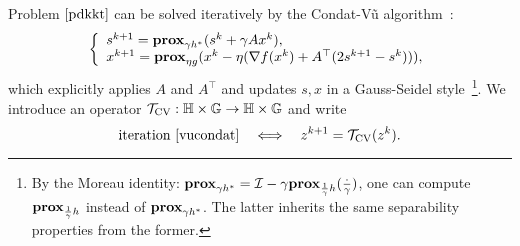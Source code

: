 {{
Problem $\eqref{pdkkt}$ can be solved iteratively by the Condat-V\~{u} algorithm~\cite{condat2013primal, vu2013splitting}:
\begin{equation}
\left\{
\begin{array}{l}
s^{k+1}=\prox_{\gamma h^*} (s^k+\gamma Ax^k),\\
x^{k+1}=\prox_{\eta g}(x^k-\eta(\nabla f(x^k)+A^\top(2s^{k+1}-s^k))),
\end{array}
\right.\label{vucondat}
\end{equation}
which explicitly applies $A$ and $A^\top$ and updates $s,x$ in a Gauss-Seidel style~\footnote{By the Moreau identity: $\mathbf{prox}_{\gamma h^*}={\mathcal{I}} -\gamma \mathbf{prox}_{\frac{1}{\gamma}h}(\frac{\cdot}{\gamma})$, one can compute $\mathbf{prox}_{\frac{1}{\gamma} h}$ instead of $\mathbf{prox}_{\gamma h^*}$. The latter inherits the same separability properties from the former.}.
We introduce an operator ${{\mathcal{T}}_{\textnormal{CV}}}:\mathbb{H}\times\mathbb{G}\to \mathbb{H}\times\mathbb{G}$ and write 
$$\mbox{iteration \eqref{vucondat}}\quad\Longleftrightarrow\quad z^{k+1}={{\mathcal{T}}_{\textnormal{CV}}}(z^k).$$ 

}}
